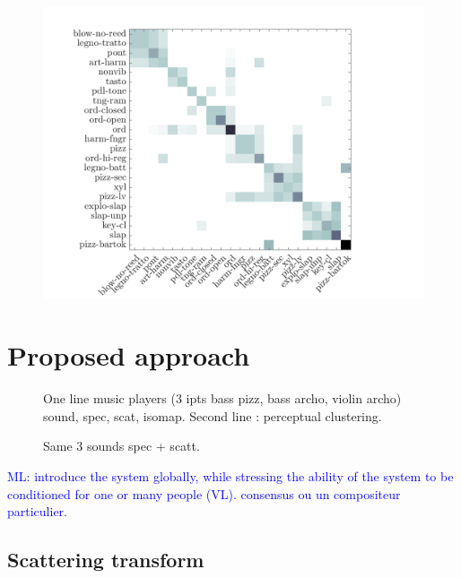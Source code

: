 \documentclass{bmcart}
\newcommand{\ml}[1]{\textcolor{blue}{ML: #1}}
\begin{document}
\begin{figure}
\center
\includegraphics[width = \textwidth]{figures/consensusVsPt.png}
\caption{ }
\label{fig:consensusVsPt}
\end{figure}

\section*{Proposed approach}
\label{sec:method}



\begin{figure}[h!]
\caption{
One line music players (3 ipts bass pizz, bass archo, violin archo) sound, spec,
scat, isomap.
Second line : perceptual clustering.}
\label{fig:pipeline}
\end{figure}

\begin{figure}[h!]
\caption{
Same 3 sounds spec + scatt.}
\end{figure}

\ml{introduce the system globally, while stressing the ability of the system to be conditioned for one or many people (VL). consensus ou un compositeur particulier.}

\subsection*{Scattering transform}
\label{sec:scattering}

\end{document}

